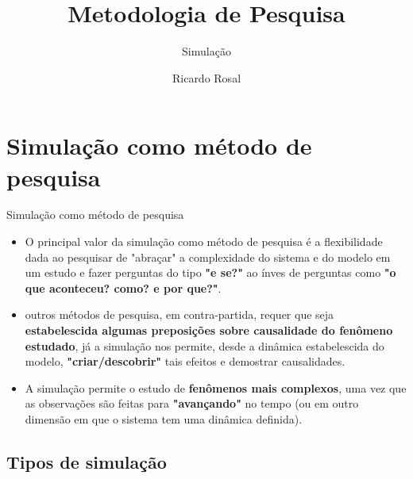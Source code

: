 \documentclass{beamer}
\title{Metodologia de Pesquisa}
\subtitle{Simulação}
\author{Ricardo Rosal}
\begin{document}
	\begin{frame}[plain]
	\maketitle
	\end{frame}	
	\begin{frame}
		\tableofcontents
	\end{frame}
	\section{Simulação como método de pesquisa}
	\begin{frame}{Simulação como método de pesquisa}
		\begin{itemize}[<+->]
			\item O principal valor da simulação como método de pesquisa é a flexibilidade dada ao pesquisar de "abraçar" a complexidade do sistema e do modelo em um estudo e fazer perguntas do tipo \textbf{"e se?"} ao ínves de perguntas como \textbf{"o que aconteceu? como? e por que?"}.
			\item outros métodos de pesquisa, em contra-partida, requer que seja \textbf{estabelescida algumas preposições sobre causalidade do fenômeno estudado}, já a simulação nos permite, desde a dinâmica estabelescida do modelo, \textbf{"criar/descobrir"} tais efeitos e demostrar causalidades.
			\item A simulação permite o estudo de \textbf{fenômenos mais complexos}, uma vez que as observações são feitas para \textbf{"avançando"} no tempo (ou em outro dimensão em que o sistema tem uma dinâmica definida).\cite{dooley_simulation_2002}
		\end{itemize}
	\end{frame}
	\subsection{Tipos de simulação}
\end{document}
